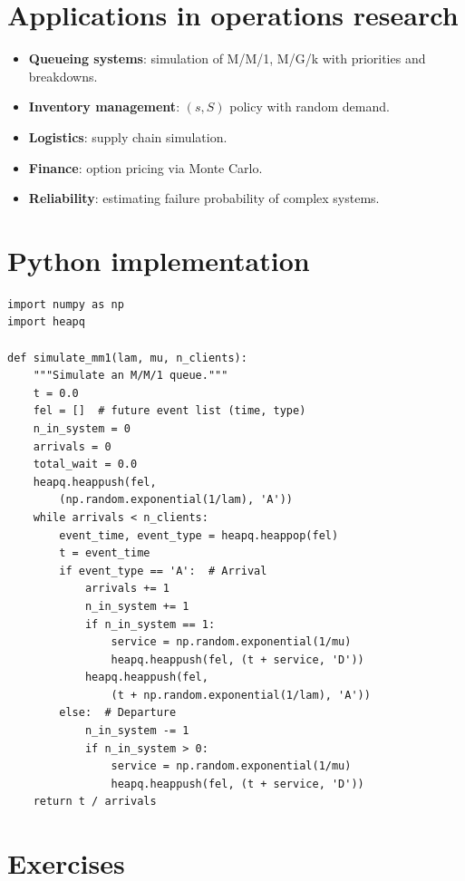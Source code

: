 \section{Applications in operations research}

\begin{itemize}
  \item \textbf{Queueing systems}: simulation of M/M/1, M/G/k with
        priorities and breakdowns.
  \item \textbf{Inventory management}: $(s, S)$ policy with random demand.
  \item \textbf{Logistics}: supply chain simulation.
  \item \textbf{Finance}: option pricing via Monte Carlo.
  \item \textbf{Reliability}: estimating failure probability of complex
        systems.
\end{itemize}

\section{Python implementation}

\begin{codeblock}[title=\textbf{M/M/1 discrete event simulation}]
\begin{verbatim}
import numpy as np
import heapq

def simulate_mm1(lam, mu, n_clients):
    """Simulate an M/M/1 queue."""
    t = 0.0
    fel = []  # future event list (time, type)
    n_in_system = 0
    arrivals = 0
    total_wait = 0.0
    heapq.heappush(fel,
        (np.random.exponential(1/lam), 'A'))
    while arrivals < n_clients:
        event_time, event_type = heapq.heappop(fel)
        t = event_time
        if event_type == 'A':  # Arrival
            arrivals += 1
            n_in_system += 1
            if n_in_system == 1:
                service = np.random.exponential(1/mu)
                heapq.heappush(fel, (t + service, 'D'))
            heapq.heappush(fel,
                (t + np.random.exponential(1/lam), 'A'))
        else:  # Departure
            n_in_system -= 1
            if n_in_system > 0:
                service = np.random.exponential(1/mu)
                heapq.heappush(fel, (t + service, 'D'))
    return t / arrivals
\end{verbatim}
\end{codeblock}

\section{Exercises}

